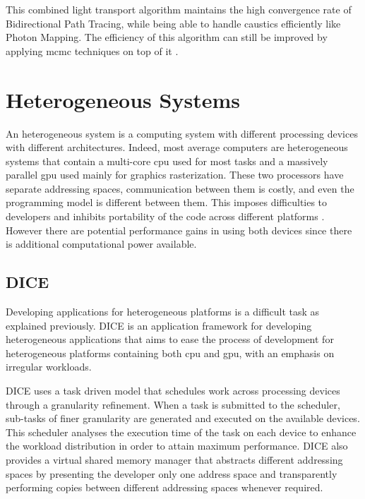 This combined light transport algorithm maintains the high convergence rate of Bidirectional Path Tracing, while being able to handle caustics efficiently like Photon Mapping. The efficiency of this algorithm can still be improved by applying \gls{mcmc} techniques on top of it \citep{Georgiev}.

\section{Heterogeneous Systems}

An heterogeneous system is a computing system with different processing devices with different architectures. Indeed, most average computers are heterogeneous systems that contain a multi-core \gls{cpu} used for most tasks and a massively parallel \gls{gpu} used mainly for graphics rasterization. These two processors have separate addressing spaces, communication between them is costly, and even the programming model is different between them. This imposes difficulties to developers and inhibits portability of the code across different platforms \citep{Kunzman}. However there are potential performance gains in using both devices since there is additional computational power available. 

\subsection{DICE}

Developing applications for heterogeneous platforms is a difficult task as explained previously. DICE \citep{Barbosa} is an application framework for developing heterogeneous applications that aims to ease the process of development for heterogeneous platforms containing both \gls{cpu} and \gls{gpu}, with an emphasis on irregular workloads.


DICE uses a task driven model that schedules work across processing devices through a granularity refinement. When a task is submitted to the scheduler, sub-tasks of finer granularity are generated and executed on the available devices. This scheduler analyses the execution time of the task on each device to enhance the workload distribution in order to attain maximum performance. DICE also provides a virtual shared memory manager that abstracts different addressing spaces by presenting the developer only one address space and transparently performing copies between different addressing spaces whenever required.

